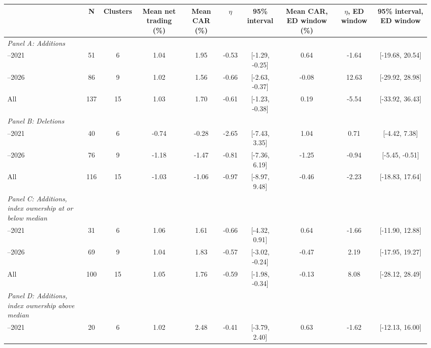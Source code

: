 \begin{threeparttable}
\begingroup
\renewcommand\cellalign{t}
\renewcommand\arraystretch{1}
\setlength{\tabcolsep}{5pt}
\begin{tabular}{@{}lccccccccc}
\toprule
 & N & Clusters & Mean net trading (\%) & Mean CAR (\%) & $\eta$ & 95\% interval & Mean CAR, ED window (\%) & $\eta$, ED window & 95\% interval, ED window \\
\midrule
\emph{Panel A: Additions} \\
\addlinespace[0.25ex]
\addlinespace[1ex]
2017–2021 & 51 & 6 & 1.04 & 1.95 & -0.53 & [-1.29, -0.25] & 0.64 & -1.64 & [-19.68, 20.54] \\
\addlinespace[0.25ex]
\addlinespace[0.25ex]
2022–2026 & 86 & 9 & 1.02 & 1.56 & -0.66 & [-2.63, -0.37] & -0.08 & 12.63 & [-29.92, 28.98] \\
\addlinespace[0.25ex]
\addlinespace[0.25ex]
All & 137 & 15 & 1.03 & 1.70 & -0.61 & [-1.23, -0.38] & 0.19 & -5.54 & [-33.92, 36.43] \\
\addlinespace[0.25ex]
\midrule
\emph{Panel B: Deletions} \\
\addlinespace[0.25ex]
\addlinespace[1ex]
2017–2021 & 40 & 6 & -0.74 & -0.28 & -2.65 & [-7.43, 3.35] & 1.04 & 0.71 & [-4.42, 7.38] \\
\addlinespace[0.25ex]
\addlinespace[0.25ex]
2022–2026 & 76 & 9 & -1.18 & -1.47 & -0.81 & [-7.36, 6.19] & -1.25 & -0.94 & [-5.45, -0.51] \\
\addlinespace[0.25ex]
\addlinespace[0.25ex]
All & 116 & 15 & -1.03 & -1.06 & -0.97 & [-8.97, 9.48] & -0.46 & -2.23 & [-18.83, 17.64] \\
\addlinespace[0.25ex]
\midrule
\emph{Panel C: Additions, index ownership at or below median} \\
\addlinespace[0.25ex]
\addlinespace[1ex]
2017–2021 & 31 & 6 & 1.06 & 1.61 & -0.66 & [-4.32, 0.91] & 0.64 & -1.66 & [-11.90, 12.88] \\
\addlinespace[0.25ex]
\addlinespace[0.25ex]
2022–2026 & 69 & 9 & 1.04 & 1.83 & -0.57 & [-3.02, -0.24] & -0.47 & 2.19 & [-17.95, 19.27] \\
\addlinespace[0.25ex]
\addlinespace[0.25ex]
All & 100 & 15 & 1.05 & 1.76 & -0.59 & [-1.98, -0.34] & -0.13 & 8.08 & [-28.12, 28.49] \\
\addlinespace[0.25ex]
\midrule
\emph{Panel D: Additions, index ownership above median} \\
\addlinespace[0.25ex]
\addlinespace[1ex]
2017–2021 & 20 & 6 & 1.02 & 2.48 & -0.41 & [-3.79, 2.40] & 0.63 & -1.62 & [-12.13, 16.00] \\

\end{tabular}
\end{threeparttable}
